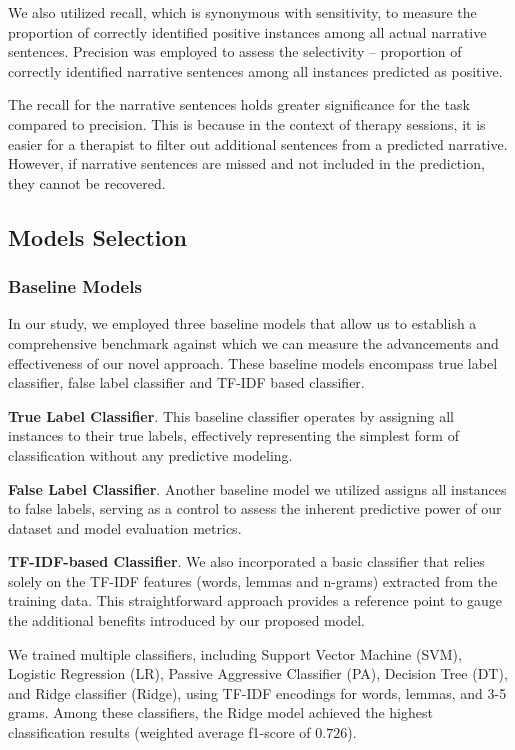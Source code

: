 \documentclass[preprint,12pt]{elsarticle}
\begin{document}
We also utilized recall, which is synonymous with sensitivity, to measure the proportion of correctly identified positive instances among all actual narrative sentences. Precision was employed to assess the selectivity -- proportion of correctly identified narrative sentences among all instances predicted as positive.

The recall for the narrative sentences holds greater significance for the task compared to precision. This is because in the context of therapy sessions, it is easier for a therapist to filter out additional sentences from a predicted narrative. However, if narrative sentences are missed and not included in the prediction, they cannot be recovered.

\subsection{Models Selection} \label{sec:Models Selection}
\subsubsection{Baseline Models}

In our study, we employed three baseline models that allow us to establish a comprehensive benchmark against which we can measure the advancements and effectiveness of our novel approach. These baseline models encompass true label classifier, false label classifier and TF-IDF
based classifier.

\textbf{True Label Classifier}. This baseline classifier operates by assigning all instances to their true labels, effectively representing the simplest form of classification without any predictive modeling.

\textbf{False Label Classifier}. Another baseline model we utilized assigns all instances to false labels, serving as a control to
assess the inherent predictive power of our dataset and model evaluation metrics.

\textbf{TF-IDF-based Classifier}. We also incorporated a basic classifier that relies solely on the TF-IDF features (words, lemmas and n-grams) extracted from the training data. This straightforward approach provides a
reference point to gauge the additional benefits introduced by our proposed model.

We trained multiple classifiers, including Support Vector Machine (SVM), Logistic Regression (LR), Passive Aggressive Classifier (PA), Decision Tree (DT), and Ridge classifier (Ridge), using TF-IDF encodings for words, lemmas, and 3-5 grams. Among these classifiers, the Ridge model achieved the highest classification results (weighted average f1-score of $0.726$).
\end{document}

